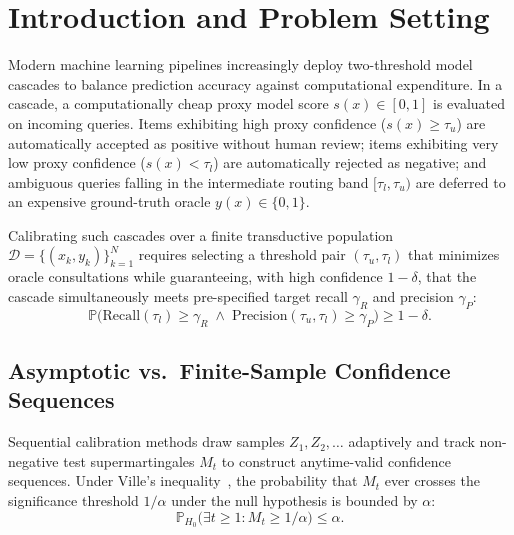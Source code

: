 \documentclass[11pt,a4paper]{article}
\begin{document}
\tableofcontents
\newpage

\section{Introduction and Problem Setting}

Modern machine learning pipelines increasingly deploy two-threshold model cascades to balance prediction accuracy against computational expenditure. In a cascade, a computationally cheap proxy model score $s(x) \in [0, 1]$ is evaluated on incoming queries. Items exhibiting high proxy confidence ($s(x) \ge \tau_u$) are automatically accepted as positive without human review; items exhibiting very low proxy confidence ($s(x) < \tau_l$) are automatically rejected as negative; and ambiguous queries falling in the intermediate routing band $[\tau_l, \tau_u)$ are deferred to an expensive ground-truth oracle $y(x) \in \{0, 1\}$.

Calibrating such cascades over a finite transductive population $\mathcal{D} = \{(x_k, y_k)\}_{k=1}^N$ requires selecting a threshold pair $(\tau_u, \tau_l)$ that minimizes oracle consultations while guaranteeing, with high confidence $1 - \delta$, that the cascade simultaneously meets pre-specified target recall $\gamma_R$ and precision $\gamma_P$:
\begin{equation}\label{eq:joint_guarantee}
\mathbb{P}\Big( \text{Recall}(\tau_l) \ge \gamma_R \;\land\; \text{Precision}(\tau_u, \tau_l) \ge \gamma_P \Big) \ge 1 - \delta.
\end{equation}

\subsection{Asymptotic vs.\ Finite-Sample Confidence Sequences}
Sequential calibration methods draw samples $Z_1, Z_2, \dots$ adaptively and track non-negative test supermartingales $M_t$ to construct anytime-valid confidence sequences. Under Ville's inequality~\cite{ville1939etude}, the probability that $M_t$ ever crosses the significance threshold $1/\alpha$ under the null hypothesis is bounded by $\alpha$:
\begin{equation}\label{eq:ville_ineq}
\mathbb{P}_{H_0}\big(\exists t \ge 1 : M_t \ge 1/\alpha\big) \le \alpha.
\end{equation}
\end{document}
